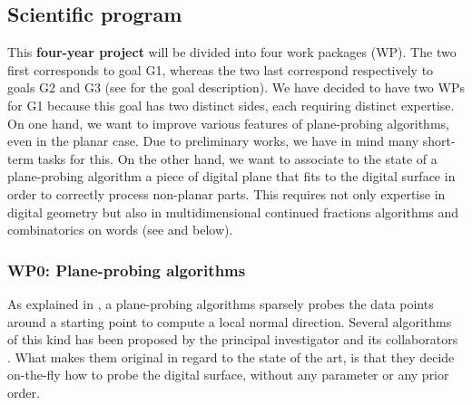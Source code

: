 

\subsection{Scientific program}
\label{sec:wp}


This \textbf{four-year project} will be divided into four work packages (WP).
The two first corresponds to goal G1, whereas the two last correspond
respectively to goals G2 and G3 (see  for the goal description).
We have decided to have two WPs for G1 because this goal has two distinct sides,
each requiring distinct expertise. On one hand, we want to improve various
features of plane-probing algorithms, even in the planar case. Due to
preliminary works, we have in mind many short-term tasks for this.
On the other hand, we want to associate to the state of a plane-probing
algorithm a piece of digital plane that fits to the digital surface in order
to correctly process non-planar parts. This requires not only expertise
in digital geometry but also in multidimensional continued
fractions algorithms and combinatorics on words (see  and below).

\subsubsection{WP0: Plane-probing algorithms}
\label{wpPPA}


As explained in , a plane-probing algorithms sparsely probes the data points
around a starting point to compute a local normal direction. Several algorithms of this kind
has been proposed by the principal investigator and its collaborators
\cite{LPRTCS2016, LPRDGCI2016, LPRJMIV2017}.
What makes them original in regard to the state of the art, is that they decide on-the-fly
how to probe the digital surface, without any parameter or any prior order.

